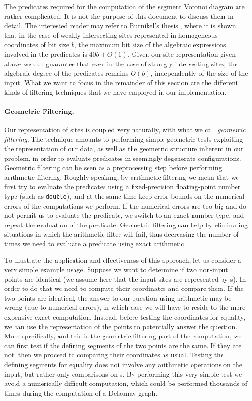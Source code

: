 The predicates required for the computation of the segment Voronoi
diagram are rather complicated. It is not the purpose of this document to
discuss them in detail. The interested reader may refer to Burnikel's
thesis \cite{b-ecvdl-96}, where it is shown that in the case of weakly
intersecting sites represented in homogeneous coordinates of bit size
$b$, the maximum bit size of the algebraic expressions involved in the
predicates is $40 b+O(1)$. Given our site representation given above we
can guarantee that even in the case of strongly intersecting sites,
the algebraic degree of the predicates remains $O(b)$, independently
of the size of the input. What we want to focus in the remainder of
this section are the different kinds of filtering techniques that we
have employed in our implementation.

\paragraph{Geometric Filtering.}
Our representation of sites is coupled very naturally, with what we
call {\em geometric filtering}. The technique
amounts to performing simple geometric tests exploiting the
representation of our data, as well as the geometric structure
inherent in our problem, in order to evaluate predicates in seemingly
degenerate configurations. Geometric filtering can be seen as a
preprocessing step before performing arithmetic filtering.
Roughly speaking, by arithmetic filtering we mean that we first try to
evaluate the predicates using a fixed-precision floating-point number
type (such as {\tt double}), and at the same time keep error bounds on
the numerical errors of the computations we perform. If the numerical
errors are too big and do not permit us to evaluate the predicate, we
switch to an exact number type, and repeat the evaluation of the
predicate. Geometric filtering can help by eliminating situations in
which the arithmetic filter will fail, thus decreasing the number
of times we need to evaluate a predicate using exact arithmetic.

To illustrate the application and effectiveness of this approach,
let us consider a very simple example usage.
Suppose we want to determine if two non-input points are
identical (we assume here that the input sites are represented by
s). In order to do that we need to compute their
coordinates and compare them. If the two points are identical, the
answer to our question using  arithmetic may be 
wrong (due to numerical errors), in which case we will have to reside
to the more expensive exact computation. Instead, before testing the
coordinates for equality, we can use the representation of the points
to potentially answer the question. More specifically, and this is the
geometric filtering part of the computation, we can first
test if the defining segments of the two points are the same. If they
are not, then we proceed to comparing their coordinates as
usual. Testing the defining segments for equality does not involve any
arithmetic operations on the input, but rather only comparisons on
s. By performing this very simple test we avoid a
numerically difficult computation, which could be performed
thousands of times during the computation of a Delaunay graph.

